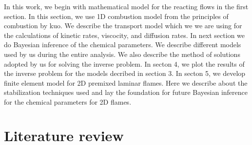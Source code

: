 \bigskip
\noindent In this work, we begin with mathematical model for the reacting flows in the first section. In this section, we use 1D combustion model from the principles of combustion by kuo. We describe the transport model which we we are using for the calculations of kinetic rates, viscocity, and diffusion rates. In next section we do Bayesian inference of the chemical parameters. We describe different models used by us during the entire analysis. We also describe the method of solutions adopted by us for solving the inverse problem. In secton 4, we plot the results of the inverse problem for the models decribed in section 3. In secton 5, we develop finite element model for 2D premixed laminar flames. Here we describe about the stabilization techniques used and lay the foundation for future Bayesian inference for the chemical parameters for 2D flames.  


\section{Literature review}

